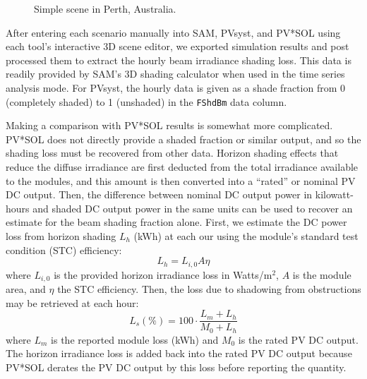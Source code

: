 \documentclass[twocolumn,10pt]{asme2ej}
\begin{document}
\begin{figure}[h!]
\begin{center}
\end{center}
\caption{Simple scene in Perth, Australia.}
\label{fig:scene3}
\end{figure}

After entering each scenario manually into SAM, PVsyst, and PV*SOL using each tool's interactive 3D scene editor, we exported simulation results and post processed them to extract the hourly beam irradiance shading loss.  This data is readily provided by SAM's 3D shading calculator when used in the time series analysis mode.  For PVsyst, the hourly data is given as a shade fraction from 0 (completely shaded) to 1 (unshaded) in the \texttt{FShdBm} data column. 

Making a comparison with PV*SOL results is somewhat more complicated.  PV*SOL does not directly provide a shaded fraction or similar output, and so the shading loss must be recovered from other data.  Horizon shading effects that reduce the diffuse irradiance are first deducted from the total irradiance available to the modules, and this amount is then converted into a ``rated'' or nominal PV DC output.  Then, the difference between nominal DC output power in kilowatt-hours and shaded DC output power in the same units can be used to recover an estimate for the beam shading fraction alone.  First, we estimate the DC power loss from horizon shading $L_h$ (kWh) at each our using the module's standard test condition (STC) efficiency:
\begin{equation}\label{eqn:pvsol_lh}
L_h = L_{i,0} A \eta
\end{equation}
where $L_{i,0}$ is the provided horizon irradiance loss in Watts/m$^2$, $A$ is the module area, and $\eta$ the STC efficiency.  Then, the loss due to shadowing from obstructions may be retrieved at each hour:
\begin{equation}\label{eqn:pvsol_ls}
L_s (\%) = 100 \cdot \frac{ L_m + L_h }{ M_{0} + L_h }
\end{equation}
where $L_{m}$ is the reported module loss (kWh) and $M_0$ is the rated PV DC output. The horizon irradiance loss is added back into the rated PV DC output because PV*SOL derates the PV DC output by this loss before reporting the quantity.  
\end{document}

